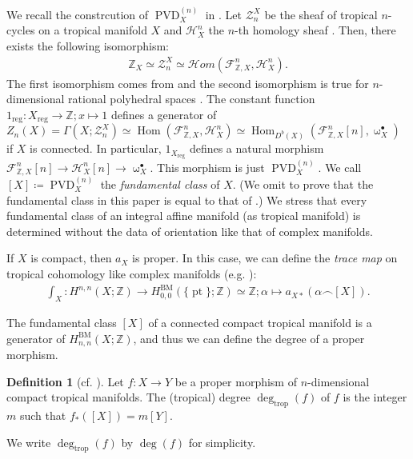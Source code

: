 \documentclass[a4paper,dvipdfmx,reqno,12pt]{amsart}
\theoremstyle{definition}
\newtheorem{definition}[theorem]{Definition}
\newcommand{\deq}{\coloneqq}
\newcommand{\opn}[1]{\operatorname{#1}}
\numberwithin{equation}{section}
\begin{document}
We recall the constrcution 
of $\opn{PVD}^{(n)}_X$ in \cite{gross2019sheaftheoretic}.
Let $\mathscr{Z}_n^{X}$ be the sheaf of tropical 
$n$-cycles \cite[Definition 3.5]{gross2019sheaftheoretic}
on a tropical manifold $X$ and 
$\mathcal{H}^{n}_X$ the $n$-th 
homology sheaf \cite[Definition 4.6]{gross2019sheaftheoretic}.
Then, there exists the following isomorphism:
\begin{align}
\mathbb{Z}_X \simeq\mathscr{Z}_n^{X}\simeq 
\mathcal{H}om(\mathcal{F}^{n}_{\mathbb{Z},X},
\mathcal{H}^{n}_X).
\end{align}
The first isomorphism comes from \cite[Lemma 2.4]{MR3041763} and
the second isomorphism is true for $n$-dimensional rational polyhedral 
spaces \cite[Proposition 5.1]{gross2019sheaftheoretic}.
The constant function
$1_{\opn{reg}}\colon X_{\opn{reg}} \to \mathbb{Z}; 
x\mapsto 1$ defines a generator of 
$Z_n(X)=\Gamma(X;\mathscr{Z}_n^{X})\simeq 
\opn{Hom}(\mathcal{F}^{n}_{\mathbb{Z},X},
\mathcal{H}^{n}_X)\simeq 
\opn{Hom}_{D^{b}(X)}(\mathcal{F}^{n}_{\mathbb{Z},X}[n],
\upomega_X^{\bullet})$ if $X$ is connected.
In particular, $1_{X_{\opn{reg}}}$ defines a 
natural morphism 
$\mathcal{F}^{n}_{\mathbb{Z},X}[n]\to \mathcal{H}^{n}_X[n] 
\to \upomega_X^{\bullet}$.
This morphism is just $\opn{PVD}^{(n)}_X$.
We call $[X]\deq \opn{PVD}_X^{(n)}$
the \emph{fundamental class} of $X$.
(We omit to prove that the fundamental class in this 
paper is equal to that of 
\cite[Definition 4.8]{MR3894860}.)
We stress that every fundamental class of an integral affine 
manifold (as tropical manifold) 
is determined without the data of orientation
like that of complex manifolds.

If $X$ is compact, then $a_{X}$ is proper. 
In this case,
we can define the \emph{trace map} 
on tropical cohomology like complex manifolds 
(e.g. \cite[Example 13.A.3]{MR2810322}):
\begin{align}  
\int_X \colon H^{n,n}(X;\mathbb{Z})\to 
H_{0,0}^{\opn{BM}}(\{\opn{pt}\};\mathbb{Z})\simeq 
\mathbb{Z}; \alpha \mapsto a_{X*}(\alpha \frown [X]).
\end{align}

The fundamental class $[X]$ of a connected compact
tropical manifold is a generator of 
$H_{n,n}^{\opn{BM}}(X;\mathbb{Z})$, and thus we 
can define the degree of a proper morphism.
\begin{definition}[{cf. \cite[Definition 2.11]{MR3668972}}]
Let $f\colon X \to Y$ be a proper morphism of 
$n$-dimensional compact tropical manifolds.
The (tropical) degree $\opn{deg}_{\opn{trop}}(f)$ of $f$ is the integer $m$
such that $f_*([X])=m[Y]$. 
\end{definition}
We write $\opn{deg}_{\opn{trop}}(f)$ by $\opn{deg}(f)$
for simplicity.
\end{document}
